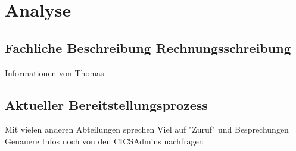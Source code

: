 \chapter{Analyse}\label{ch:analyse}

\section{Fachliche Beschreibung Rechnungsschreibung}
Informationen von Thomas

\section{Aktueller Bereitstellungsprozess}
Mit vielen anderen Abteilungen sprechen
Viel auf "Zuruf" und Besprechungen
Genauere Infos noch von den CICSAdmins nachfragen

